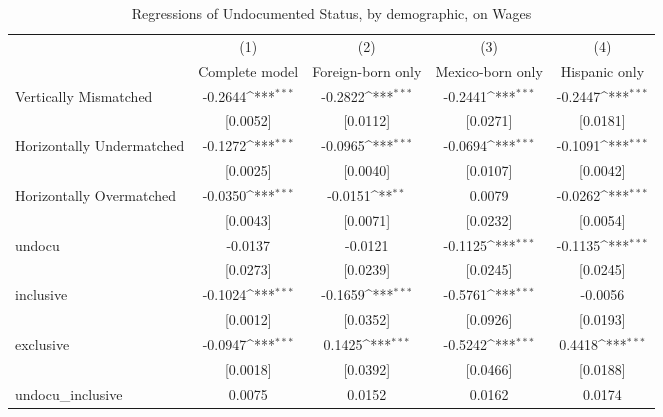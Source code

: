 \begin{table}[htbp]\centering
\def\sym#1{\ifmmode^{#1}\else\(^{#1}\)\fi}
\caption{Regressions of Undocumented Status, by demographic, on Wages}
\begin{tabular}{l*{4}{c}}
\toprule
                    &\multicolumn{1}{c}{(1)}         &\multicolumn{1}{c}{(2)}         &\multicolumn{1}{c}{(3)}         &\multicolumn{1}{c}{(4)}         \\
                    &Complete model         &Foreign-born only         &Mexico-born only         &Hispanic only         \\
\midrule
Vertically Mismatched&     -0.2644\sym{***}&     -0.2822\sym{***}&     -0.2441\sym{***}&     -0.2447\sym{***}\\
                    &    [0.0052]         &    [0.0112]         &    [0.0271]         &    [0.0181]         \\
\addlinespace
Horizontally Undermatched&     -0.1272\sym{***}&     -0.0965\sym{***}&     -0.0694\sym{***}&     -0.1091\sym{***}\\
                    &    [0.0025]         &    [0.0040]         &    [0.0107]         &    [0.0042]         \\
\addlinespace
Horizontally Overmatched&     -0.0350\sym{***}&     -0.0151\sym{**} &      0.0079         &     -0.0262\sym{***}\\
                    &    [0.0043]         &    [0.0071]         &    [0.0232]         &    [0.0054]         \\
\addlinespace
undocu              &     -0.0137         &     -0.0121         &     -0.1125\sym{***}&     -0.1135\sym{***}\\
                    &    [0.0273]         &    [0.0239]         &    [0.0245]         &    [0.0245]         \\
\addlinespace
inclusive           &     -0.1024\sym{***}&     -0.1659\sym{***}&     -0.5761\sym{***}&     -0.0056         \\
                    &    [0.0012]         &    [0.0352]         &    [0.0926]         &    [0.0193]         \\
\addlinespace
exclusive           &     -0.0947\sym{***}&      0.1425\sym{***}&     -0.5242\sym{***}&      0.4418\sym{***}\\
                    &    [0.0018]         &    [0.0392]         &    [0.0466]         &    [0.0188]         \\
\addlinespace
undocu\_inclusive    &      0.0075         &      0.0152         &      0.0162         &      0.0174         \\

\end{tabular}
\end{table}
